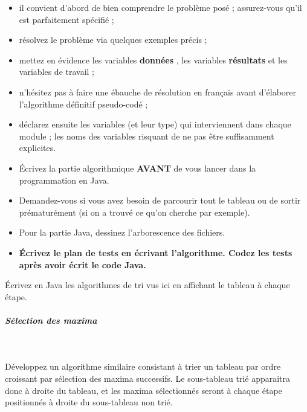\documentclass[11pt,a4paper]{article}
\begin{document}
					\begin{itemize}
				
			\item il convient d'abord de bien comprendre le probl\`eme pos\'e ; assurez-vous qu'il est parfaitement sp\'ecifi\'e ;
			\item r\'esolvez le probl\`eme via quelques exemples pr\'ecis ;
			\item mettez en \'evidence les variables \textbf{\guillemotleft  donn\'ees \guillemotright }, les variables \textbf{\guillemotleft  r\'esultats \guillemotright } et les variables de travail ;
			\item n'h\'esitez pas \`a faire une \'ebauche de r\'esolution en fran\c cais avant d'\'elaborer l'algorithme d\'efinitif pseudo-cod\'e ;
			\item d\'eclarez ensuite les variables (et leur type) qui interviennent dans chaque module ; les noms des variables risquant de ne pas \^etre suffisamment explicites.
			\item \'Ecrivez la partie algorithmique \textbf{AVANT} de vous lancer dans la programmation en Java.
			\item Demandez-vous si vous avez besoin de parcourir tout le tableau ou de sortir pr\'ematur\'ement (si on a trouv\'e ce qu'on cherche par exemple).
			\item Pour la partie Java, dessinez l'arborescence des fichiers. 
			\item \textbf{\'Ecrivez le plan de tests en \'ecrivant l'algorithme. Codez les tests apr\`es avoir \'ecrit le code Java.}
					\end{itemize}
				
            \par
        
        \'Ecrivez en Java les algorithmes de tri vus ici en affichant le tableau \`a chaque \'etape.
      
            \par
        
			
		\subparagraph{S\'election des maxima} 
		
					\textcolor{white}{.} \par
				
        D\'eveloppez un algorithme similaire consistant \`a trier un tableau par ordre croissant par
        s\'election des maxima successifs. Le sous-tableau tri\'e apparaitra donc \`a droite du tableau,
        et les maxima s\'electionn\'es seront \`a chaque \'etape positionn\'es \`a droite du sous-tableau non tri\'e.
      
\end{document}

